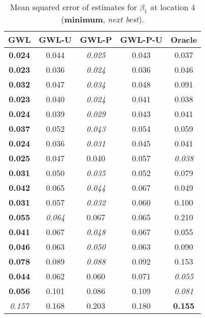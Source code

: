 \documentclass[authoryear, review, 11pt]{elsarticle}
\begin{document}
\begin{table}[ht]
\begin{center}
\begin{tabular}{ccccc}
 GWL & GWL-U & GWL-P & GWL-P-U & Oracle \\ 
  \hline
\textbf{0.024} & 0.044 & \emph{0.025} & 0.043 & 0.037 \\ 
  \textbf{0.023} & 0.036 & \emph{0.024} & 0.036 & 0.046 \\ 
  \textbf{0.032} & 0.047 & \emph{0.034} & 0.048 & 0.091 \\ 
  \textbf{0.023} & 0.040 & \emph{0.024} & 0.041 & 0.038 \\ 
  \textbf{0.024} & 0.039 & \emph{0.029} & 0.043 & 0.041 \\ 
  \textbf{0.037} & 0.052 & \emph{0.043} & 0.054 & 0.059 \\ 
  \textbf{0.024} & 0.036 & \emph{0.031} & 0.045 & 0.041 \\ 
  \textbf{0.025} & 0.047 & 0.040 & 0.057 & \emph{0.038} \\ 
  \textbf{0.031} & 0.050 & \emph{0.035} & 0.052 & 0.079 \\ 
  \textbf{0.042} & 0.065 & \emph{0.044} & 0.067 & 0.049 \\ 
  \textbf{0.031} & 0.057 & \emph{0.032} & 0.060 & 0.100 \\ 
  \textbf{0.055} & \emph{0.064} & 0.067 & 0.065 & 0.210 \\ 
  \textbf{0.041} & 0.067 & \emph{0.048} & 0.067 & 0.055 \\ 
  \textbf{0.046} & 0.063 & \emph{0.050} & 0.063 & 0.090 \\ 
  \textbf{0.078} & 0.089 & \emph{0.088} & 0.092 & 0.153 \\ 
  \textbf{0.044} & 0.062 & 0.060 & 0.071 & \emph{0.055} \\ 
  \textbf{0.056} & 0.101 & 0.086 & 0.109 & \emph{0.081} \\ 
  \emph{0.157} & 0.168 & 0.203 & 0.180 & \textbf{0.155} \\ 
  \end{tabular}
\caption{Mean squared error of estimates for $\beta_1$ at location 4 (\textbf{minimum}, \emph{next best}).\label{MSEX-nonzero}}
\end{center}
\end{table}
\end{document}
